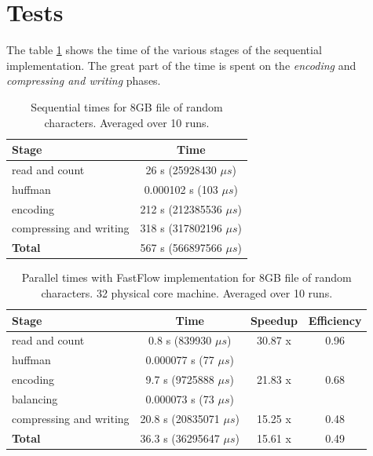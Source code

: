\documentclass[12pt, letterpaper]{article}
\begin{document}
\section{Tests \label{sec:tests}}

The table \ref{tab:sequential_times} shows the time of the various stages of the sequential implementation. The great part of the time is spent on the \textit{encoding} and \textit{compressing and writing} phases.

\begin{table}[h]
\begin{center}
\begin{tabular}{l c}
    \textbf{Stage} & \textbf{Time}  \\
    \hline
    read and count & 26 s (25928430 $\mu s$) \\
    \hline
    huffman &  0.000102 s (103 $\mu s$) \\
    \hline
    encoding &  212 s  (212385536 $\mu s$) \\
    \hline
    compressing and writing & 318 s (317802196 $\mu s$) \\
    \hline
    \textbf{Total} & 567 s (566897566 $\mu s$) \\ 
\end{tabular}
\caption{Sequential times for 8GB file of random characters. Averaged over 10 runs.}
\label{tab:sequential_times}
\end{center}
\end{table}


\begin{table}[h]
\begin{center}
\begin{tabular}{l c c c}
    \textbf{Stage} & \textbf{Time} & \textbf{Speedup} & \textbf{Efficiency} \\
    \hline
    read and count & 0.8 s (839930 $\mu s$) & 30.87 x & 0.96 \\
    \hline
    huffman & 0.000077 s (77 $\mu s$)  &  \\
    \hline
    encoding & 9.7 s (9725888 $\mu s$)  &  21.83 x & 0.68 \\
    \hline
    balancing & 0.000073 s (73 $\mu s$)  &\\
    \hline
    compressing and writing &  20.8 s (20835071 $\mu s$)  & 15.25 x & 0.48 \\
    \hline
    \textbf{Total} & 36.3 s (36295647 $\mu s$)   & 15.61 x & 0.49 \\ 
\end{tabular}
\caption{Parallel times with FastFlow implementation for 8GB file of random characters. 32 physical core machine. Averaged over 10 runs.}
\label{tab:ff_times}
\end{center}
\end{table}
\end{document}
